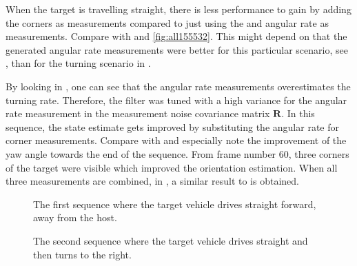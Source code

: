 When the target is travelling straight, there is less performance to gain by adding the corners as measurements compared to just using the \abbrROI and angular rate as measurements.
Compare  with  and \ref{fig:all155532}.
This might depend on that the generated angular rate measurements were better for this particular scenario, see , than for the turning scenario in .

By looking in , one can see that the angular rate measurements overestimates the turning rate.
Therefore, the filter was tuned with a high variance for the angular rate measurement in the measurement noise covariance matrix $\bm{R}$.
In this sequence, the state estimate gets improved by substituting the angular rate for corner measurements.
Compare  with  and especially note the improvement of the yaw angle towards the end of the sequence.
From frame number 60, three corners of the target were visible which improved the orientation estimation.
When all three measurements are combined, in , a similar result to  is obtained.

\begin{figure}[!ht]
	\centering


	\caption{\label{fig:sequence155532} The first sequence where the target vehicle drives straight forward, away from the host.}
\end{figure}

\begin{figure}[!ht]
	\centering


	\caption{\label{fig:sequence155733} The second sequence where the target vehicle drives straight and then turns to the right.}
\end{figure}

